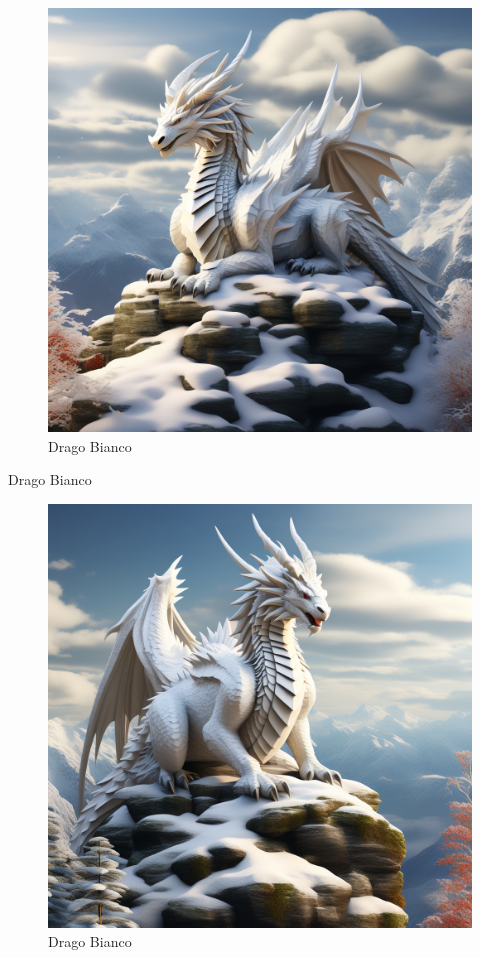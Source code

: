 \begin{figure}
\centering
\includegraphics{create-an-image-of-a-white-dragon-resting-on-top-of-a-snowy-mountain-with-the-stylised-style-of-medi-2 1.png}
\caption{Drago Bianco}
\end{figure}

Drago Bianco

\begin{figure}
\centering
\includegraphics{create-an-image-of-a-white-dragon-resting-on-top-of-a-snowy-mountain-with-the-stylised-style-of-medi.png}
\caption{Drago Bianco}
\end{figure}

